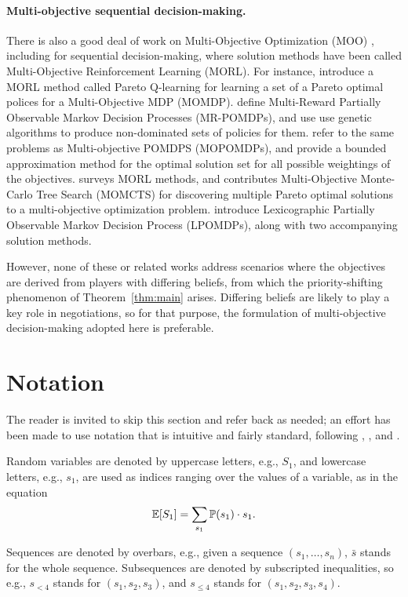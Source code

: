 \documentclass{article}
\newcommand{\seq}{\bar}
\newcommand{\thm}[1]{Theorem~\ref{thm:#1}}
\begin{document}
\paragraph{Multi-objective sequential decision-making.} There is also a good deal of work on Multi-Objective Optimization (MOO)  \citep{tzeng2011multiple}, including for sequential decision-making, where solution methods have been called Multi-Objective Reinforcement Learning (MORL).  For instance, \citet{gabor1998multi} introduce a MORL method called Pareto Q-learning for learning a set of a Pareto optimal polices for a Multi-Objective MDP (MOMDP).  \citet{soh2011evolving} define Multi-Reward Partially Observable Markov Decision Processes (MR-POMDPs), and use use genetic algorithms to produce non-dominated sets of policies for them.  \citet{roijers2015point} refer to the same problems as Multi-objective POMDPS (MOPOMDPs), and provide a bounded approximation method for the optimal solution set for all possible weightings of the objectives.  \citet{wang2014multi} surveys MORL methods, and contributes Multi-Objective Monte-Carlo Tree Search (MOMCTS) for discovering multiple Pareto optimal solutions to a multi-objective optimization problem.   \citet{wray2015multi} introduce Lexicographic Partially Observable Markov Decision Process (LPOMDPs), along with two accompanying solution methods.

However, none of these or related works address scenarios where the objectives are derived from players with differing beliefs, from which the priority-shifting phenomenon of \thm{main} arises.  Differing beliefs are likely to play a key role in negotiations, so for that purpose, the formulation of multi-objective decision-making adopted here is preferable.

\section{Notation}
The reader is invited to skip this section and refer back as needed; an effort has been made to use notation that is intuitive and fairly standard, following \citet{pearl2009causality}, \citet{hutter2003gentle}, and \citet{orseau2012space}.

Random variables are denoted by uppercase letters, e.g., $S_1$, and lowercase letters, e.g., $s_1$, are used as indices ranging over the values of a variable, as in the equation
\[
\mathbb{E}[S_1] = \sum_{s_1} \mathbb{P}(s_1)\cdot s_1.
\]

Sequences are denoted by overbars, e.g., given a sequence $(s_1,\ldots,s_n)$, $\seq s$ stands for the whole sequence.   Subsequences are denoted
by subscripted inequalities, so e.g., $s_{<4}$ stands for $(s_1,s_2,s_3)$,
and $s_{\le 4}$ stands for $(s_1,s_2,s_3,s_4)$.
\end{document}
